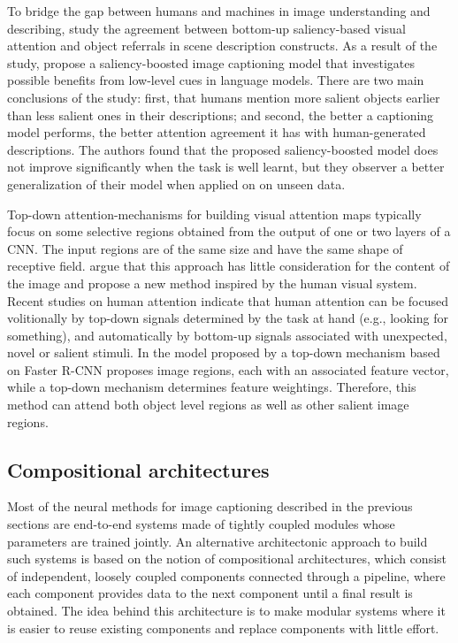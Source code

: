 To bridge the gap between humans and machines in image understanding and describing, \citet{Tavakoliy2017} study the agreement between bottom-up saliency-based visual attention and object referrals in scene description constructs. As a result of the study, \citeauthor{Tavakoliy2017} propose a saliency-boosted image captioning model that investigates possible benefits from low-level cues in language models. There are two main conclusions of the study: first, that humans mention more salient objects earlier than less salient ones in their descriptions; and second, the better a captioning model performs, the better attention agreement it has with human-generated descriptions. The authors found that the proposed saliency-boosted model does not improve significantly when the task is well learnt, but they observer a better generalization of their model when applied on on unseen data.

Top-down attention-mechanisms for building visual attention maps typically focus on some selective regions obtained from the output of one or two layers of a CNN. The input regions are of the same size and have the same shape of receptive field. \citet{Anderson2018} argue that this approach has little consideration for the content  of the image and propose a new method inspired by the human visual system. Recent studies on human attention \citep{Buschman2007} indicate that human attention can be focused volitionally by top-down signals determined by the task at hand (e.g., looking for something), and automatically by bottom-up signals associated with unexpected, novel or salient stimuli. In the model proposed by \citeauthor{Anderson2018} a top-down mechanism based on Faster R-CNN \citet{Ren2015} proposes image regions, each with an associated feature vector, while a top-down mechanism determines feature weightings. Therefore, this method can attend both object level regions as well as other salient image regions. 

\subsection{Compositional architectures}

Most of the neural methods for image captioning described in the previous sections are end-to-end systems made of tightly coupled modules whose parameters are trained jointly. An alternative architectonic approach to build such systems is based on the notion of compositional architectures, which consist of independent, loosely coupled components connected through a pipeline, where each component provides data to the next component until a final result is obtained. The idea behind this architecture is to make modular systems where it is easier to reuse existing components and replace components with little effort.

